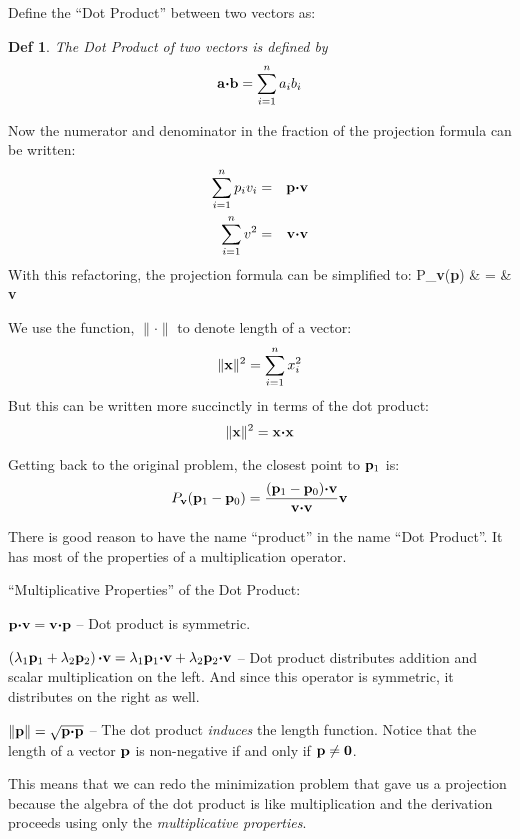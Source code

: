 \documentclass[12pt]{article}
\newtheorem{DD}{Def}
\begin{document}
{Define the ``Dot Product'' between two vectors as: 
\begin{DD}{The Dot Product of two vectors is defined by}
$${\bf a} {\boldsymbol \cdot} {\bf b} = \sum_{i=1}^n a_i b_i$$
\end{DD}
Now the numerator and denominator in the fraction of the projection 
formula can be written:
\begin{eqnarray*}
  \sum_{i=1}^n p_i v_i & = & {\bf p} {\boldsymbol \cdot} {\bf v} \\
  \sum_{i=1}^n v^2 & = & {\bf v} {\boldsymbol \cdot} {\bf v}
\end{eqnarray*}
With this refactoring, the projection formula can be simplified to:
\be
  P_{\bf v}({\bf p}) & = &  {\bf v}
\ee

We use the function, $\| \cdot \|$ to denote length of a vector:
$$ \|{\bf x}\|^2 = \sum_{i=1}^n x_i^2$$
But this can be written more succinctly in terms of the dot product: 
$$ \|{\bf x}\|^2 = {\bf x} {\boldsymbol \cdot} {\bf x} $$


Getting back to the original problem, the closest point to ${\bf p}_1$ is:
$$ P_{\bf v}({\bf p}_1 - {\bf p}_0) = \frac{({\bf p}_1 - {\bf p}_0) 
    {\boldsymbol \cdot}{\bf v}}{{\bf v} {\boldsymbol \cdot} {\bf v}} {\bf v}$$

There is good reason to have the name ``product'' in the name ``Dot Product''. 
It has most of the properties of a multiplication operator.

``Multiplicative Properties'' of the Dot Product:
\bi
  \item{${\bf p} {\boldsymbol \cdot} {\bf v} = {\bf v} 
      {\boldsymbol \cdot} {\bf p} $ -- Dot product is symmetric.}
  \item{$\left(\lambda_1 {\bf p}_1 + \lambda_2 {\bf p}_2\right) 
      {\boldsymbol \cdot} {\bf v} = \lambda_1 {\bf p}_1 {\boldsymbol \cdot} {\bf v} + 
      \lambda_2 {\bf p}_2 {\boldsymbol \cdot} {\bf v} $ 
    -- Dot product distributes addition and scalar multiplication on the left. 
    And since this operator is symmetric, it distributes on the right as well.}
  \item{$\|{\bf p}\| = \sqrt{{\bf p} {\boldsymbol \cdot} {\bf p}}$ -- 
    The dot product {\em induces\/} the length function. 
    Notice that the length of a vector ${\bf p}$ is non-negative if and only 
    if ${\bf p} \neq {\bf 0}$.}
\ei

This means that we can redo the minimization problem that gave us a 
projection because the algebra of the dot product is like multiplication 
and the derivation proceeds using only the {\em multiplicative properties\/}.

}
\end{document}
